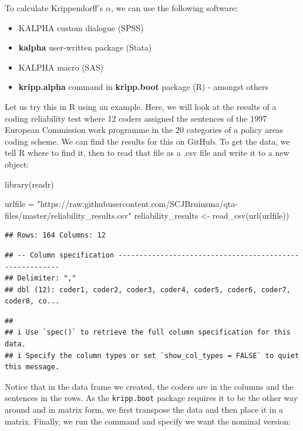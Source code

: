 \documentclass[
]{article}
\newenvironment{Shaded}{\begin{snugshade}}{\end{snugshade}}
\newcommand{\FunctionTok}[1]{\textcolor[rgb]{0.00,0.00,0.00}{#1}}
\newcommand{\NormalTok}[1]{#1}
\newcommand{\OtherTok}[1]{\textcolor[rgb]{0.56,0.35,0.01}{#1}}
\newcommand{\StringTok}[1]{\textcolor[rgb]{0.31,0.60,0.02}{#1}}
\providecommand{\tightlist}{%
  \setlength{\itemsep}{0pt}\setlength{\parskip}{0pt}}
\begin{document}
To calculate Krippendorff's \(\alpha\), we can use the following software:

\begin{itemize}
\tightlist
\item
  KALPHA custom dialogue (SPSS)
\item
  \textbf{kalpha} user-written package (Stata)
\item
  KALPHA macro (SAS)
\item
  \textbf{kripp.alpha} command in \textbf{kripp.boot} package (R) - amongst others
\end{itemize}

Let us try this in R using an example. Here, we will look at the results of a coding reliability test where 12 coders assigned the sentences of the 1997 European Commission work programme in the 20 categories of a policy areas coding scheme. We can find the results for this on GitHub. To get the data, we tell R where to find it, then to read that file as a .csv file and write it to a new object:

\begin{Shaded}
\begin{Highlighting}[]
\FunctionTok{library}\NormalTok{(readr)}

\NormalTok{urlfile }\OtherTok{=} \StringTok{"https://raw.githubusercontent.com/SCJBruinsma/qta{-}files/master/reliability\_results.csv"}
\NormalTok{reliability\_results }\OtherTok{\textless{}{-}} \FunctionTok{read\_csv}\NormalTok{(}\FunctionTok{url}\NormalTok{(urlfile))}
\end{Highlighting}
\end{Shaded}

\begin{verbatim}
## Rows: 164 Columns: 12
\end{verbatim}

\begin{verbatim}
## -- Column specification --------------------------------------------------------
## Delimiter: ","
## dbl (12): coder1, coder2, coder3, coder4, coder5, coder6, coder7, coder8, co...
\end{verbatim}

\begin{verbatim}
## 
## i Use `spec()` to retrieve the full column specification for this data.
## i Specify the column types or set `show_col_types = FALSE` to quiet this message.
\end{verbatim}

Notice that in the data frame we created, the coders are in the columns and the sentences in the rows. As the \texttt{kripp.boot} package requires it to be the other way around and in matrix form, we first transpose the data and then place it in a matrix. Finally, we run the command and specify we want the nominal version:
\end{document}
